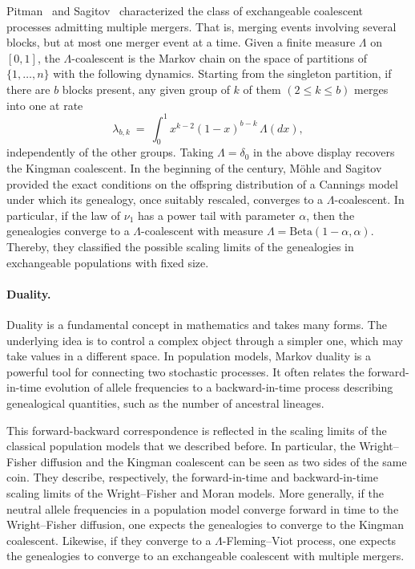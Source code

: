Pitman~\cite{Pitman:1999aa} and Sagitov~\cite{sagitov1999general} characterized the class of exchangeable coalescent processes admitting multiple mergers. That is, merging events involving several blocks, but at most one merger event at a time. Given a finite measure $\Lambda$ on $[0,1]$, the $\Lambda$-coalescent is the Markov chain on the space of partitions of $\{1,\ldots,n\}$ with the following dynamics.
 Starting from the singleton partition, if there are $b$ blocks present, any given group of $k$ of them $(2 \leq k \leq b)$ merges into one at rate
\[
\lambda_{b,k}\ =\ \int_0^1 x^{k-2} (1-x)^{b-k}\, \Lambda(dx),
\]
independently of the other groups. Taking $\Lambda = \delta_0$ in the above display recovers the Kingman coalescent. In the beginning of the century, Möhle and Sagitov~\cite{Mohle_Sagitov} provided the exact conditions on the offspring distribution of a Cannings model under which its genealogy, once suitably rescaled, converges to a $\Lambda$-coalescent. 
In particular, if the law of $\nu_1$ has a power tail with parameter $\alpha$, then the genealogies converge to a $\Lambda$-coalescent with measure $\Lambda=\mathrm{Beta}(1-\alpha, \alpha)$.
Thereby, they classified the possible scaling limits of the genealogies in exchangeable populations with fixed size.

\paragraph{Duality.} 
Duality is a fundamental concept in mathematics and takes many forms. The underlying idea is to control a complex object through a simpler one, which may take values in a different space. In population models, Markov duality is a powerful tool for connecting two stochastic processes. It often relates the forward-in-time evolution of allele frequencies to a backward-in-time process describing genealogical quantities, such as the number of ancestral lineages.

This forward-backward correspondence is reflected in the scaling limits of the classical population models that we described before. In particular, the Wright--Fisher diffusion and the Kingman coalescent can be seen as two sides of the same coin. They describe, respectively, the forward-in-time and backward-in-time scaling limits of the Wright--Fisher and Moran models. More generally, if the neutral allele frequencies in a population model converge forward in time to the Wright--Fisher diffusion, one expects the genealogies to converge to the Kingman coalescent. 
Likewise, if they converge to a $\Lambda$-Fleming--Viot process, one expects the genealogies to converge to an exchangeable coalescent with multiple mergers.

